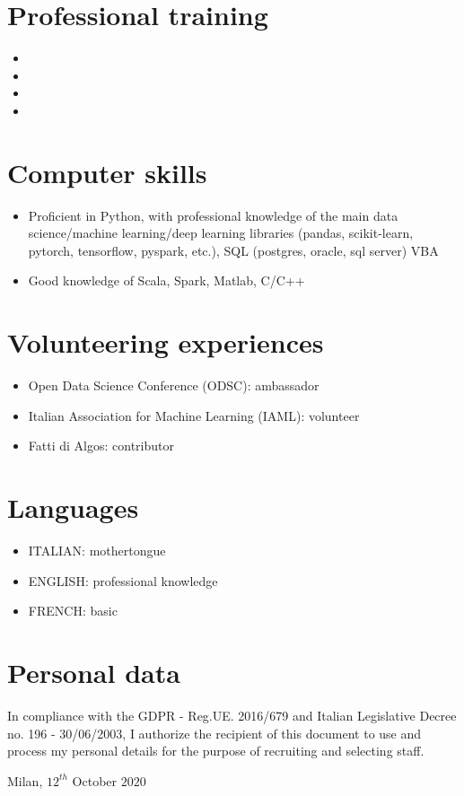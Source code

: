 \documentclass[11pt,a4paper,sans]{moderncv}        %
\begin{document}
\section{Professional training}
\begin{itemize}
\item{}
\item{}
\item{}
\item{}
\end{itemize}

\section{Computer skills}
\begin{itemize}
\item Proficient in Python, with professional knowledge of the main data science/machine learning/deep learning libraries (pandas, scikit-learn, pytorch, tensorflow, pyspark, etc.), SQL (postgres, oracle, sql server) VBA
\item Good knowledge of Scala, Spark, Matlab, C/C++ 
\end{itemize}

\section{Volunteering experiences}
\begin{itemize}
 \item Open Data Science Conference (ODSC): ambassador
 \item Italian Association for Machine Learning (IAML): volunteer
 \item Fatti di Algos: contributor
\end{itemize} 

\section{Languages}
\begin{itemize}
 \item ITALIAN: mothertongue
 \item ENGLISH: professional knowledge
 \item FRENCH: basic
\end{itemize} 

\section{Personal data}
In compliance with the GDPR - Reg.UE. 2016/679 and Italian Legislative Decree no. 196 - 30/06/2003, I authorize the recipient of this document to use and process my personal details for the purpose of recruiting and selecting staff. 


\bigskip 
\bigskip 
\bigskip 
\bigskip 
Milan, $12^{th}$ October $2020$
\end{document}
